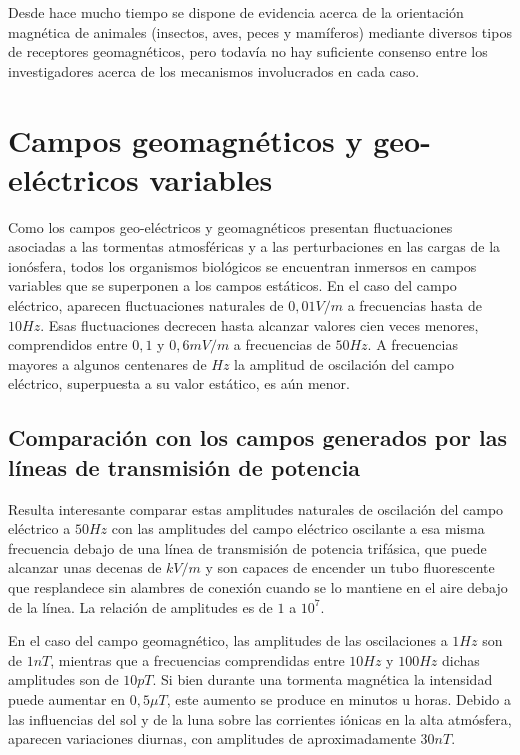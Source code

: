 Desde hace mucho tiempo se dispone de evidencia acerca de la orientación magnética de animales (insectos, aves, peces y mamíferos) mediante diversos tipos de receptores geomagnéticos, pero todavía no hay suficiente consenso entre los investigadores acerca de los mecanismos involucrados en cada caso.

\section{Campos geomagnéticos y geo-eléctricos variables}

Como los campos geo-eléctricos y geomagnéticos presentan fluctuaciones asociadas a las tormentas atmosféricas y a las perturbaciones en las cargas de la ionósfera, todos los organismos biológicos se encuentran inmersos en campos variables que se superponen a los campos estáticos.
En el caso del campo eléctrico, aparecen fluctuaciones naturales de $0,01 V/m$ a frecuencias hasta de $10 Hz$.
Esas fluctuaciones decrecen hasta alcanzar valores cien veces menores, comprendidos entre $0,1$ y $0,6 mV/m$ a frecuencias de $50 Hz$.
A frecuencias mayores a algunos centenares de $Hz$ la amplitud de oscilación del campo eléctrico, superpuesta a su valor estático, es aún menor.

\subsection{Comparación con los campos generados por las líneas de transmisión de potencia}

Resulta interesante comparar estas amplitudes naturales de oscilación del campo eléctrico a $50 Hz$ con las amplitudes del campo eléctrico oscilante a esa misma frecuencia debajo de una línea de transmisión de potencia trifásica, que puede alcanzar unas decenas de $kV/m$ y son capaces de encender un tubo fluorescente que resplandece sin alambres de conexión cuando se lo mantiene en el aire debajo de la línea. La relación de amplitudes es de $1$ a $10^{7}$.

En el caso del campo geomagnético, las amplitudes de las oscilaciones a $1 Hz$ son de $1 nT$, mientras que a frecuencias comprendidas entre $10 Hz$ y $100 Hz$ dichas amplitudes son de $10 pT$.
Si bien durante una tormenta magnética la intensidad puede aumentar en $0,5 \mu T$, este aumento se produce en minutos u horas.
Debido a las influencias del sol y de la luna sobre las corrientes iónicas en la alta atmósfera, aparecen variaciones diurnas, con amplitudes de aproximadamente $30 nT$.

